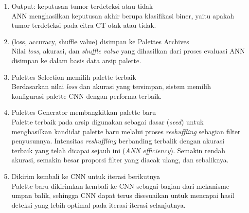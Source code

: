 \begin{enumerate}
	\item Output: keputusan tumor terdeteksi atau tidak\\
	ANN menghasilkan keputusan akhir berupa klasifikasi biner, yaitu apakah tumor terdeteksi pada citra CT otak atau tidak.
	
	\item (loss, accuracy, shuffle value) disimpan ke Palettes Archives\\
	Nilai \textit{loss}, akurasi, dan \textit{shuffle value} yang dihasilkan dari proses evaluasi ANN disimpan ke dalam basis data arsip palette.
	
	\item Palettes Selection memilih palette terbaik\\
	Berdasarkan nilai \textit{loss} dan akurasi yang tersimpan, sistem memilih konfigurasi palette CNN dengan performa terbaik.
	
	\item Palettes Generator membangkitkan palette baru\\
	Palette terbaik pada arsip digunakan sebagai dasar (\textit{seed}) untuk menghasilkan kandidat palette baru melalui proses \textit{reshuffling} sebagian filter penyusunnya. Intensitas \textit{reshuffling} berbanding terbalik dengan akurasi terbaik yang telah dicapai sejauh ini (\textit{ANN efficiency}). Semakin rendah akurasi, semakin besar proporsi filter yang diacak ulang, dan sebaliknya.
	
	\item Dikirim kembali ke CNN untuk iterasi berikutnya\\
	Palette baru dikirimkan kembali ke CNN sebagai bagian dari mekanisme umpan balik, sehingga CNN dapat terus disesuaikan untuk mencapai hasil deteksi yang lebih optimal pada iterasi-iterasi selanjutnya.
\end{enumerate}

